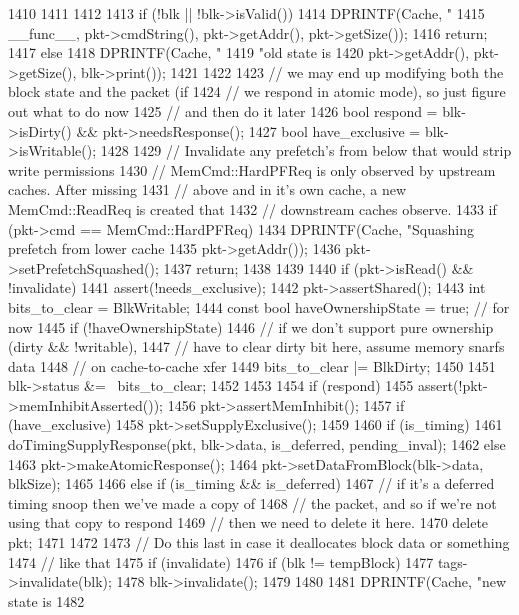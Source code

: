 \begin{DoxyCode}
{{{1410         }
1411     }
1412 
1413      if (!blk || !blk->isValid()) {
1414          DPRINTF(Cache, "%
1415                  __func__, pkt->cmdString(), pkt->getAddr(), pkt->getSize());
1416          return;
1417      } else {
1418         DPRINTF(Cache, "%
1419                 "old state is %
1420                 pkt->getAddr(), pkt->getSize(), blk->print());
1421      }
1422 
1423     // we may end up modifying both the block state and the packet (if
1424     // we respond in atomic mode), so just figure out what to do now
1425     // and then do it later
1426     bool respond = blk->isDirty() && pkt->needsResponse();
1427     bool have_exclusive = blk->isWritable();
1428 
1429     // Invalidate any prefetch's from below that would strip write permissions
1430     // MemCmd::HardPFReq is only observed by upstream caches.  After missing
1431     // above and in it's own cache, a new MemCmd::ReadReq is created that
1432     // downstream caches observe.
1433     if (pkt->cmd == MemCmd::HardPFReq) {
1434         DPRINTF(Cache, "Squashing prefetch from lower cache %
1435                 pkt->getAddr());
1436         pkt->setPrefetchSquashed();
1437         return;
1438     }
1439 
1440     if (pkt->isRead() && !invalidate) {
1441         assert(!needs_exclusive);
1442         pkt->assertShared();
1443         int bits_to_clear = BlkWritable;
1444         const bool haveOwnershipState = true; // for now
1445         if (!haveOwnershipState) {
1446             // if we don't support pure ownership (dirty && !writable),
1447             // have to clear dirty bit here, assume memory snarfs data
1448             // on cache-to-cache xfer
1449             bits_to_clear |= BlkDirty;
1450         }
1451         blk->status &= ~bits_to_clear;
1452     }
1453 
1454     if (respond) {
1455         assert(!pkt->memInhibitAsserted());
1456         pkt->assertMemInhibit();
1457         if (have_exclusive) {
1458             pkt->setSupplyExclusive();
1459         }
1460         if (is_timing) {
1461             doTimingSupplyResponse(pkt, blk->data, is_deferred, pending_inval);
1462         } else {
1463             pkt->makeAtomicResponse();
1464             pkt->setDataFromBlock(blk->data, blkSize);
1465         }
1466     } else if (is_timing && is_deferred) {
1467         // if it's a deferred timing snoop then we've made a copy of
1468         // the packet, and so if we're not using that copy to respond
1469         // then we need to delete it here.
1470         delete pkt;
1471     }
1472 
1473     // Do this last in case it deallocates block data or something
1474     // like that
1475     if (invalidate) {
1476         if (blk != tempBlock)
1477             tags->invalidate(blk);
1478         blk->invalidate();
1479     }
1480 
1481     DPRINTF(Cache, "new state is %
1482 }
\end{DoxyCode}

